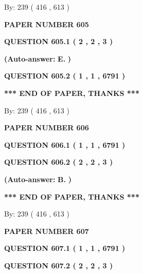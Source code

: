 \documentclass[12pt]{article}
\begin{document}
   
\hspace{1.0in} By: 
 239 ( 416 ,  613 )
   
   
   
   
\newpage 
\setcounter{page}{ 
   605001 } 
   
   
 {\textbf{ \Large{ PAPER NUMBER  605  }}}
   
   
   
   
  
  
{\textbf{\large{QUESTION
605.1 
 ( 2 , 2 , 3 )
}}}
 
 
{\textbf{(Auto-answer:}}
{\textbf{\large{
E.}}}
{\textbf{)}}
 
 
  
  
{\textbf{\large{QUESTION
605.2 
 ( 1 , 1 , 6791 )
}}}
   
   
   
   
\vspace{1.0in} 
{\textbf{\large{ *** END OF PAPER, THANKS *** }}} 
   
   
\hspace{1.0in} By: 
 239 ( 416 ,  613 )
   
   
   
   
\newpage 
\setcounter{page}{ 
   606001 } 
   
   
 {\textbf{ \Large{ PAPER NUMBER  606  }}}
   
   
   
   
  
  
{\textbf{\large{QUESTION
606.1 
 ( 1 , 1 , 6791 )
}}}
  
  
{\textbf{\large{QUESTION
606.2 
 ( 2 , 2 , 3 )
}}}
 
 
{\textbf{(Auto-answer:}}
{\textbf{\large{
B.}}}
{\textbf{)}}
 
 
   
   
   
   
\vspace{1.0in} 
{\textbf{\large{ *** END OF PAPER, THANKS *** }}} 
   
   
\hspace{1.0in} By: 
 239 ( 416 ,  613 )
   
   
   
   
\newpage 
\setcounter{page}{ 
   607001 } 
   
   
 {\textbf{ \Large{ PAPER NUMBER  607  }}}
   
   
   
   
  
  
{\textbf{\large{QUESTION
607.1 
 ( 1 , 1 , 6791 )
}}}
  
  
{\textbf{\large{QUESTION
607.2 
 ( 2 , 2 , 3 )
}}}
 
\end{document}
